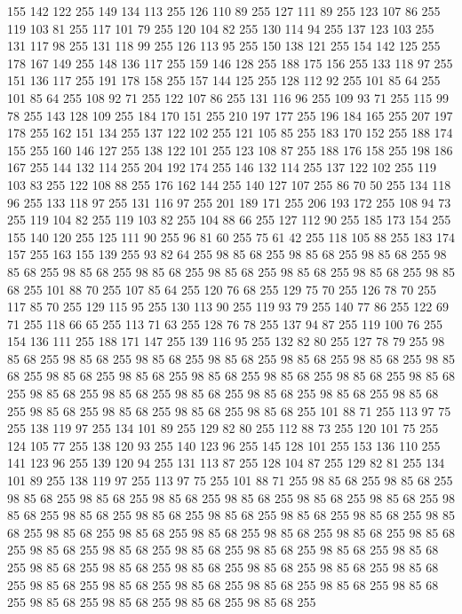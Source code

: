 155 142 122 255 149 134 113 255 126 110 89 255 127 111 89 255 123 107 86 255 119 103 81 255 117 101 79 255 120 104 82 255 130 114 94 255 137 123 103 255 131 117 98 255 131 118 99 255 126 113 95 255 150 138 121 255 154 142 125 255 178 167 149 255 148 136 117 255 159 146 128 255 188 175 156 255 133 118 97 255 151 136 117 255 191 178 158 255 157 144 125 255 128 112 92 255 101 85 64 255 101 85 64 255 108 92 71 255 122 107 86 255 131 116 96 255 109 93 71 255 115 99 78 255 143 128 109 255 184 170 151 255 210 197 177 255 196 184 165 255 207 197 178 255 162 151 134 255 137 122 102 255 121 105 85 255 183 170 152 255 188 174 155 255 160 146 127 255 138 122 101 255 123 108 87 255 188 176 158 255 198 186 167 255 144 132 114 255 204 192 174 255 146 132 114 255 137 122 102 255 119 103 83 255 122 108 88 255 176 162 144 255 140 127 107 255 86 70 50 255 134 118 96 255 133 118 97 255 131 116 97 255 201 189 171 255 206 193 172 255 108 94 73 255 119 104 82 255 119 103 82 255 104 88 66 255
127 112 90 255 185 173 154 255 155 140 120 255 125 111 90 255 96 81 60 255 75 61 42 255 118 105 88 255 183 174 157 255 163 155 139 255 93 82 64 255 98 85 68 255 98 85 68 255 98 85 68 255 98 85 68 255 98 85 68 255 98 85 68 255 98 85 68 255 98 85 68 255 98 85 68 255 98 85 68 255 101 88 70 255 107 85 64 255 120 76 68 255 129 75 70 255 126 78 70 255 117 85 70 255 129 115 95 255 130 113 90 255 119 93 79 255 140 77 86 255 122 69 71 255 118 66 65 255 113 71 63 255 128 76 78 255 137 94 87 255 119 100 76 255 154 136 111 255 188 171 147 255 139 116 95 255 132 82 80 255 127 78 79 255 98 85 68 255 98 85 68 255 98 85 68 255 98 85 68 255 98 85 68 255 98 85 68 255 98 85 68 255 98 85 68 255 98 85 68 255 98 85 68 255 98 85 68 255 98 85 68 255 98 85 68 255 98 85 68 255 98 85 68 255 98 85 68 255 98 85 68 255 98 85 68 255 98 85 68 255 98 85 68 255 98 85 68 255 98 85 68 255 98 85 68 255
101 88 71 255 113 97 75 255 138 119 97 255 134 101 89 255 129 82 80 255 112 88 73 255 120 101 75 255 124 105 77 255 138 120 93 255 140 123 96 255 145 128 101 255 153 136 110 255 141 123 96 255 139 120 94 255 131 113 87 255 128 104 87 255 129 82 81 255 134 101 89 255 138 119 97 255 113 97 75 255 101 88 71 255 98 85 68 255 98 85 68 255 98 85 68 255 98 85 68 255 98 85 68 255 98 85 68 255 98 85 68 255 98 85 68 255 98 85 68 255 98 85 68 255 98 85 68 255 98 85 68 255 98 85 68 255 98 85 68 255 98 85 68 255 98 85 68 255 98 85 68 255 98 85 68 255 98 85 68 255 98 85 68 255 98 85 68 255 98 85 68 255 98 85 68 255 98 85 68 255 98 85 68 255 98 85 68 255 98 85 68 255 98 85 68 255 98 85 68 255 98 85 68 255 98 85 68 255 98 85 68 255 98 85 68 255 98 85 68 255 98 85 68 255 98 85 68 255 98 85 68 255 98 85 68 255 98 85 68 255 98 85 68 255 98 85 68 255 98 85 68 255 98 85 68 255

